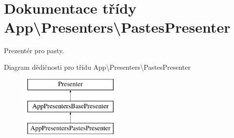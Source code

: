 \hypertarget{classApp_1_1Presenters_1_1PastesPresenter}{\section{Dokumentace třídy App\textbackslash{}Presenters\textbackslash{}Pastes\-Presenter}
\label{classApp_1_1Presenters_1_1PastesPresenter}
}


Prezentér pro pasty.  


Diagram dědičnosti pro třídu App\textbackslash{}Presenters\textbackslash{}Pastes\-Presenter\begin{figure}[H]
\begin{center}
\leavevmode
\includegraphics[height=3.000000cm]{classApp_1_1Presenters_1_1PastesPresenter}
\end{center}
\end{figure}
